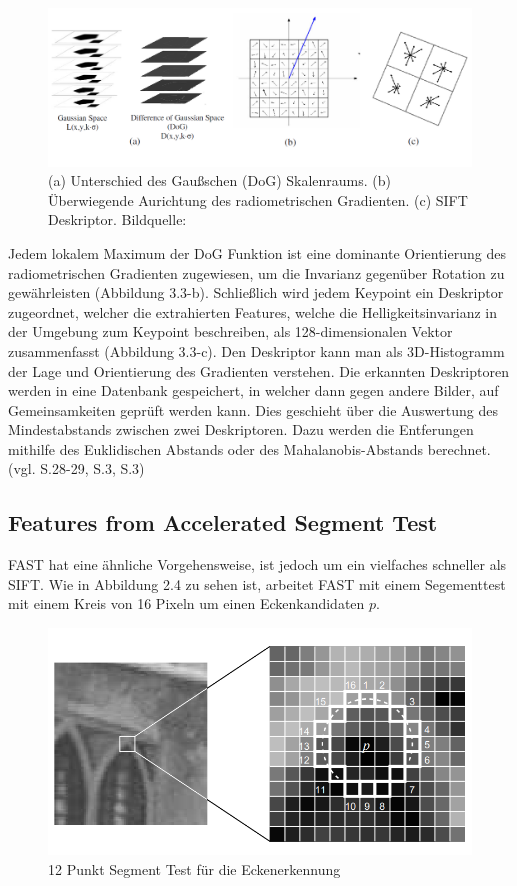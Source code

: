 \begin{figure}[H]
	\centering
	\includegraphics[scale=0.5]{sift.png}
	\caption{(a) Unterschied des Gaußschen (DoG) Skalenraums. (b) Überwiegende Aurichtung des radiometrischen Gradienten. (c) SIFT Deskriptor. Bildquelle: \cite{old_new_feature}}
\end{figure}

Jedem lokalem Maximum der DoG Funktion ist eine dominante Orientierung des radiometrischen Gradienten zugewiesen, um die Invarianz gegenüber Rotation zu gewährleisten (Abbildung 3.3-b).
Schließlich wird jedem Keypoint ein Deskriptor zugeordnet, welcher die extrahierten Features, welche die Helligkeitsinvarianz in der Umgebung zum Keypoint beschreiben, als 128-dimensionalen Vektor zusammenfasst (Abbildung 3.3-c). Den Deskriptor kann man als 3D-Histogramm der Lage und Orientierung des Gradienten verstehen. Die erkannten Deskriptoren werden in eine Datenbank gespeichert, in welcher dann gegen andere Bilder, auf Gemeinsamkeiten geprüft werden kann. Dies geschieht über die Auswertung des Mindestabstands zwischen zwei Deskriptoren. Dazu werden die Entferungen mithilfe des  Euklidischen Abstands oder des Mahalanobis-Abstands berechnet.  (vgl. \cite{natural_feature} S.28-29, \cite{det_des} S.3, \cite{old_new_feature} S.3) 

\subsection{Features from Accelerated Segment Test}
FAST hat eine ähnliche Vorgehensweise, ist jedoch um ein vielfaches schneller als SIFT. Wie in Abbildung 2.4 zu sehen ist, arbeitet FAST mit einem Segementtest mit einem Kreis von 16 Pixeln um einen Eckenkandidaten $p$. 

\begin{figure}[H]
	\centering
	\includegraphics[scale=0.5]{fast.png}
	\caption{12 Punkt Segment Test für die Eckenerkennung \cite{fast}}
\end{figure}

